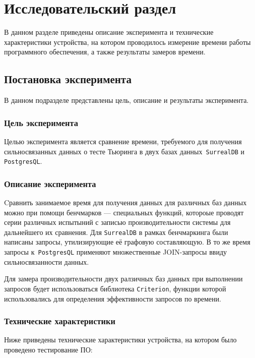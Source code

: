 \section{Исследовательский раздел}

В данном разделе приведены описание эксперимента и технические характеристики устройства, на котором проводилось измерение времени работы программного обеспечения, а также результаты замеров времени.

\subsection{Постановка эксперимента}

В данном подразделе представлены цель, описание и результаты эксперимента.

\subsubsection{Цель эксперимента}

Целью эксперимента является сравнение времени, требуемого для получения сильносвязанных данных о тесте Тьюринга в двух базах данных~\texttt{SurrealDB} и \texttt{PostgresQL}.

\subsubsection{Описание эксперимента}
Cравнить занимаемое время для получения данных для различных баз данных можно при помощи бенчмарков --- специальных функций, котороые проводят серии различных испытыний с записью производительности системы для дальнейшего их сравнения.
Для \texttt{SurrealDB} в рамках бенчмаркинга были написаны запросы, утилизирующие её графовую составляющую.
В то же время запросы к~\texttt{PostgresQL} применяют множественные JOIN-запросы ввиду сильносвязанности данных.

Для замера производительности двух ралзичных баз данных при выполнении запросов будет использоваться библиотека \texttt{Criterion}, функции которой использовались для определения эффективности запросов по времени.

\subsubsection{Технические характеристики}

Ниже приведены технические характеристики устройства, на котором было проведено тестирование ПО:

